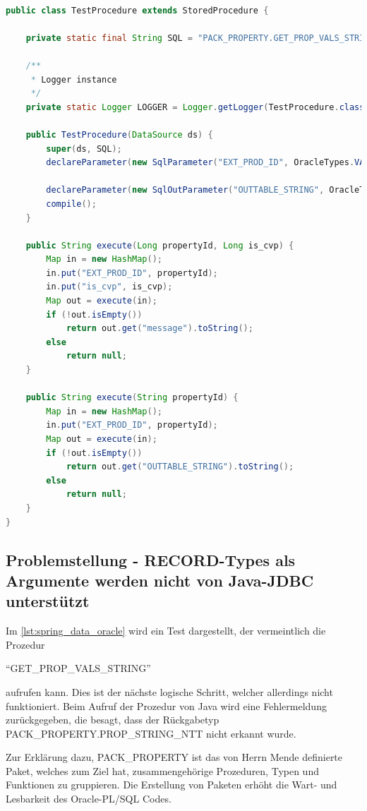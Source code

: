 \begin{lstlisting}[caption=Spring Data Oracle - Aufruf der Prozeduren mit Rückgabetabellen, language=java, label=lst:spring_data_oracle]

public class TestProcedure extends StoredProcedure {

    private static final String SQL = "PACK_PROPERTY.GET_PROP_VALS_STRING";

    /**
     * Logger instance
     */
    private static Logger LOGGER = Logger.getLogger(TestProcedure.class);

	public TestProcedure(DataSource ds) {
		super(ds, SQL);
		declareParameter(new SqlParameter("EXT_PROD_ID", OracleTypes.VARCHAR));

		declareParameter(new SqlOutParameter("OUTTABLE_STRING", OracleTypes.STRUCT, "PACK_PROPERTY.PROP_STRING_NTT", new SqlReturnSqlData(PropStringNtt.class)));
		compile();
	}

	public String execute(Long propertyId, Long is_cvp) {
		Map in = new HashMap();
		in.put("EXT_PROD_ID", propertyId);
        in.put("is_cvp", is_cvp);
		Map out = execute(in);
		if (!out.isEmpty())
			return out.get("message").toString();
		else
			return null;
	}

    public String execute(String propertyId) {
		Map in = new HashMap();
		in.put("EXT_PROD_ID", propertyId);
		Map out = execute(in);
		if (!out.isEmpty())
			return out.get("OUTTABLE_STRING").toString();
		else
			return null;
	}
}
\end{lstlisting}

\subsection{Problemstellung - RECORD-Types als Argumente werden nicht von Java-JDBC unterstützt}

Im \autoref{lst:spring_data_oracle} wird ein Test dargestellt, der vermeintlich die Prozedur 

\enquote{GET\_PROP\_VALS\_STRING} 

aufrufen kann. Dies ist der nächste logische Schritt, welcher allerdings nicht funktioniert. Beim Aufruf der Prozedur von Java wird eine Fehlermeldung zurückgegeben, die besagt, dass der Rückgabetyp PACK\_PROPERTY.PROP\_STRING\_NTT nicht erkannt wurde. 

Zur Erklärung dazu, PACK\_PROPERTY ist das von Herrn Mende definierte Paket, welches zum Ziel hat, zusammengehörige Prozeduren, Typen und Funktionen zu gruppieren. Die Erstellung von Paketen erhöht die Wart- und Lesbarkeit des Oracle-PL/SQL Codes. 

